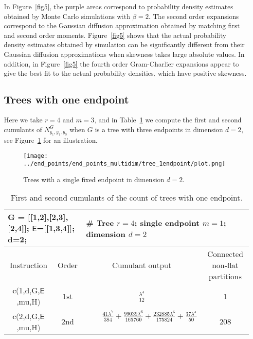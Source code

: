 \documentclass[12pt]{article}
\newcommand{\EE}{\mathsf{E}}
\numberwithin{equation}{section}
\begin{document}
\vspace{-0.3cm}

\noindent
In Figure~\ref{fig5}, the purple areas correspond to probability density estimates obtained by Monte Carlo simulations with $\beta = 2$. 
The second order expansions correspond to
the Gaussian diffusion approximation 
obtained by matching first and second order moments. 
Figure~\ref{fig5} shows that
the actual probability density estimates obtained by simulation 
can be significantly different from
their Gaussian diffusion approximations when 
skewness takes large absolute values. 
In addition, in Figure~\ref{fig5} 
the fourth order Gram-Charlier expansions appear to give the best fit
to the actual probability densities, 
which have positive skewness. 

\subsection{Trees with one endpoint}
\noindent
 Here we take $r=4$ and $m=3$, and in Table~\ref{t3-1} we 
 compute the first and second cumulants of $N^G_{y_1,y_1,y_3}$ when $G$ is
 a tree with three endpoints in dimension $d=2$, 
 see Figure~\ref{fig9} for an illustration. 

\begin{figure}[H]
\centering
\texttt{[image: ../end\_points/end\_points\_multidim/tree\_1endpoint/plot.png]} 
\caption{Trees with a single fixed endpoint in dimension $d=2$.} 
\label{fig9}
\end{figure}

\vspace{-0.3cm} 

\begin{table}[H] 
  \centering
    \resizebox{\textwidth}{!}
      {
  \begin{tabular}{|ll|ll|} %
 \hline
 \multicolumn{2}{|l}{
   G = [[1,2],[2,3],[2,4]];
    $\EE$=[[1,3,4]]; d=2;
}
  & \multicolumn{2}{l|}{\# Tree $r=4$; single endpoint $m=1$; dimension $d=2$} 
 \\
\hline
\hline
\multicolumn{1}{|c|}{Instruction} & \multicolumn{1}{c|}{Order} & \multicolumn{1}{c|}{Cumulant output} & \multicolumn{1}{c|}{Connected non-flat partitions} 
\\ 
\hline
\multicolumn{1}{|c|}{c(1,d,G,$\EE$,mu,H)} & \multicolumn{1}{c|}{\small 1st} & \multicolumn{1}{c|}{\large $\frac{{\lambda}^{4}}{12}$} & \multicolumn{1}{c|}{\small 1} 
\\ 
\hline
\multicolumn{1}{|c|}{c(2,d,G,$\EE$,mu,H)} & \multicolumn{1}{c|}{\small 2nd} & \multicolumn{1}{c|}{\large ~~~~$
\frac{41{\lambda}^{7}}{384}  + \frac{99039{\lambda}^{6}}{165760}  + \frac{232885{\lambda}^{5}}{175824}  + \frac{37{\lambda}^{4}}{50}$~~~~} & \multicolumn{1}{c|}{\small 208} 
\\ %
\hline
\end{tabular}
}
\caption{First and second cumulants of the count of trees with one endpoint.}
\label{t3-1}
\end{table} 
\end{document}
